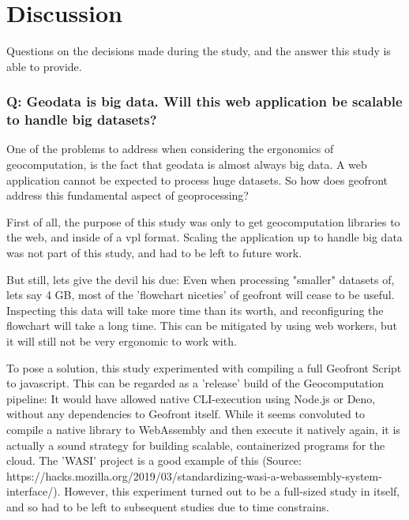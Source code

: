 \section{Discussion}
\label{sec:discussion}
Questions on the decisions made during the study, and the answer this study is able to provide.

\subsubsection*{Q: Geodata is big data. Will this web application be scalable to handle big datasets?}


One of the problems to address when considering the ergonomics of geocomputation, is the fact that geodata is almost always big data. 
A web application cannot be expected to process huge datasets. 
So how does geofront address this fundamental aspect of geoprocessing? 

First of all, the purpose of this study was only to get geocomputation libraries to the web, and inside of a vpl format. 
Scaling the application up to handle big data was not part of this study, and had to be left to future work. 

But still, lets give the devil his due:
Even when processing "smaller" datasets of, lets say 4 GB, most of the 'flowchart niceties' of geofront will cease to be useful. 
Inspecting this data will take more time than its worth, and reconfiguring the flowchart will take a long time. 
This can be mitigated by using web workers, but it will still not be very ergonomic to work with. 

To pose a solution, this study experimented with compiling a full Geofront Script to javascript.
This can be regarded as a 'release' build of the Geocomputation pipeline: 
It would have allowed native CLI-execution using Node.js or Deno, without any dependencies to Geofront itself. 
While it seems convoluted to compile a native library to WebAssembly and then execute it natively again, it is actually a sound strategy for building scalable, containerized programs for the cloud. 
The 'WASI' project is a good example of this (Source: https://hacks.mozilla.org/2019/03/standardizing-wasi-a-webassembly-system-interface/). 
However, this experiment turned out to be a full-sized study in itself, and so had to be left to subsequent studies due to time constrains. 

